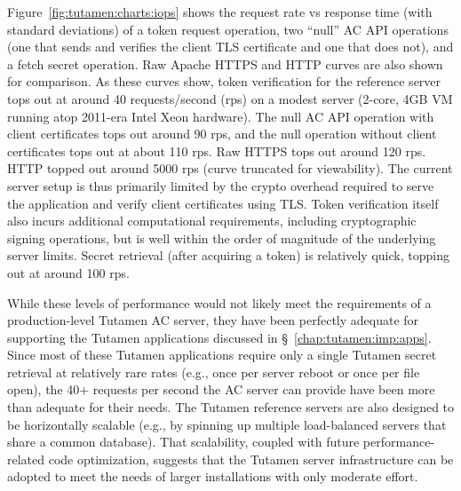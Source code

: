 Figure~\ref{fig:tutamen:charts:iops} shows the request rate vs
response time (with standard deviations) of a token request operation,
two ``null'' AC API operations (one that sends and verifies the client
TLS certificate and one that does not), and a fetch secret
operation. Raw Apache HTTPS and HTTP curves are also shown for
comparison. As these curves show, token verification for the reference
server tops out at around 40 requests/second (rps) on a modest server
(2-core, 4GB VM running atop 2011-era Intel Xeon hardware). The null
AC API operation with client certificates tops out around 90 rps, and
the null operation without client certificates tops out at about 110
rps. Raw HTTPS tops out around 120 rps. HTTP topped out around 5000
rps (curve truncated for viewability). The current server setup is
thus primarily limited by the crypto overhead required to serve the
application and verify client certificates using TLS. Token
verification itself also incurs additional computational requirements,
including cryptographic signing operations, but is well within the
order of magnitude of the underlying server limits. Secret retrieval
(after acquiring a token) is relatively quick, topping out at around
100 rps.

While these levels of performance would not likely meet the
requirements of a production-level Tutamen AC server, they have been
perfectly adequate for supporting the Tutamen applications discussed
in \S~\ref{chap:tutamen:imp:apps}. Since most of these Tutamen
applications require only a single Tutamen secret retrieval at
relatively rare rates (e.g., once per server reboot or once per file
open), the 40+ requests per second the AC server can provide have been
more than adequate for their needs. The Tutamen reference servers are
also designed to be horizontally scalable (e.g., by spinning up
multiple load-balanced servers that share a common database). That
scalability, coupled with future performance-related code
optimization, suggests that the Tutamen server infrastructure can be
adopted to meet the needs of larger installations with only moderate
effort.

